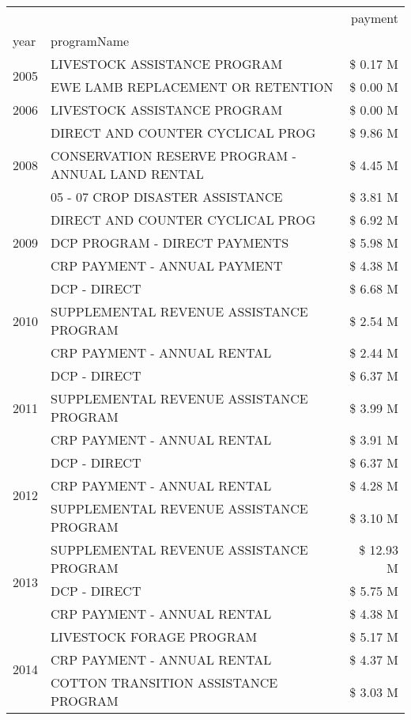 \begin{tabular}{llr}
\toprule
 &  & payment \\
year & programName &  \\
\midrule
\multirow[t]{2}{*}{2005} & LIVESTOCK ASSISTANCE PROGRAM & \$ 0.17 M \\
 & EWE LAMB REPLACEMENT OR RETENTION & \$ 0.00 M \\
\cline{1-3}
2006 & LIVESTOCK ASSISTANCE PROGRAM & \$ 0.00 M \\
\cline{1-3}
\multirow[t]{3}{*}{2008} & DIRECT AND COUNTER CYCLICAL PROG & \$ 9.86 M \\
 & CONSERVATION RESERVE PROGRAM - ANNUAL LAND RENTAL & \$ 4.45 M \\
 & 05 - 07 CROP DISASTER ASSISTANCE & \$ 3.81 M \\
\cline{1-3}
\multirow[t]{3}{*}{2009} & DIRECT AND COUNTER CYCLICAL PROG & \$ 6.92 M \\
 & DCP PROGRAM - DIRECT PAYMENTS & \$ 5.98 M \\
 & CRP PAYMENT - ANNUAL PAYMENT & \$ 4.38 M \\
\cline{1-3}
\multirow[t]{3}{*}{2010} & DCP - DIRECT & \$ 6.68 M \\
 & SUPPLEMENTAL REVENUE ASSISTANCE PROGRAM & \$ 2.54 M \\
 & CRP PAYMENT - ANNUAL RENTAL & \$ 2.44 M \\
\cline{1-3}
\multirow[t]{3}{*}{2011} & DCP - DIRECT & \$ 6.37 M \\
 & SUPPLEMENTAL REVENUE ASSISTANCE PROGRAM & \$ 3.99 M \\
 & CRP PAYMENT - ANNUAL RENTAL & \$ 3.91 M \\
\cline{1-3}
\multirow[t]{3}{*}{2012} & DCP - DIRECT & \$ 6.37 M \\
 & CRP PAYMENT - ANNUAL RENTAL & \$ 4.28 M \\
 & SUPPLEMENTAL REVENUE ASSISTANCE PROGRAM & \$ 3.10 M \\
\cline{1-3}
\multirow[t]{3}{*}{2013} & SUPPLEMENTAL REVENUE ASSISTANCE PROGRAM & \$ 12.93 M \\
 & DCP - DIRECT & \$ 5.75 M \\
 & CRP PAYMENT - ANNUAL RENTAL & \$ 4.38 M \\
\cline{1-3}
\multirow[t]{3}{*}{2014} & LIVESTOCK FORAGE PROGRAM & \$ 5.17 M \\
 & CRP PAYMENT - ANNUAL RENTAL & \$ 4.37 M \\
 & COTTON TRANSITION ASSISTANCE PROGRAM & \$ 3.03 M \\

\end{tabular}
